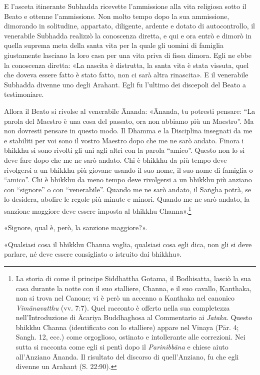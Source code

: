 E l’asceta itinerante Subhadda ricevette l’ammissione alla vita
religiosa sotto il Beato e ottenne l’ammissione. Non molto tempo dopo la
sua ammissione, dimorando in solitudine, appartato, diligente, ardente e
dotato di autocontrollo, il venerabile Subhadda realizzò la conoscenza
diretta, e qui e ora entrò e dimorò in quella suprema meta della santa
vita per la quale gli uomini di famiglia giustamente lasciano la loro
casa per una vita priva di fissa dimora.
Egli ne ebbe la conoscenza diretta: «La nascita è distrutta, la santa vita è stata vissuta, quel
che doveva essere fatto è stato fatto, non ci sarà altra rinascita». E
il venerabile Subhadda divenne uno degli Arahant. Egli fu l’ultimo dei
discepoli del Beato a testimoniare.


Allora il Beato si rivolse al venerabile Ānanda: «Ānanda, tu potresti
pensare: “La parola del Maestro è una cosa del passato, ora non abbiamo
più un Maestro”. Ma non dovresti pensare in questo modo. Il Dhamma e la
Disciplina insegnati da me e stabiliti per voi sono il vostro Maestro
dopo che me ne sarò andato. Finora i bhikkhu si sono rivolti gli uni
agli altri con la parola “amico”. Questo non lo si deve fare dopo che me
ne sarò andato. Chi è bhikkhu da più tempo deve rivolgersi a un bhikkhu
più giovane usando il suo nome, il suo nome di famiglia o “amico”. Chi è
bhikkhu da meno tempo deve rivolgersi a un bhikkhu più anziano con
“signore” o con “venerabile”. Quando me ne sarò andato, il Saṅgha potrà,
se lo desidera, abolire le regole più minute e minori. Quando me ne sarò
andato, la sanzione maggiore deve essere imposta al bhikkhu
Channa».\footnote{La storia di come il principe Siddhattha Gotama, il Bodhisatta, lasciò la sua casa durante la notte con il suo stalliere, Channa, e il suo cavallo, Kanthaka, non si trova nel Canone; vi è però un accenno a Kanthaka nel canonico \emph{Vimānavatthu} (vv. 7:7). Quel racconto è offerto nella sua completezza nell’Introduzione di Ācariya Buddhaghosa al Commentario ai \emph{Jataka}. Questo bhikkhu Channa (identificato con lo stalliere) appare nel Vinaya (Pār. 4; Sangh. 12, ecc.) come orgoglioso, ostinato e intollerante alle correzioni. Nei sutta si racconta come egli si pentì dopo il \emph{Parinibbāna} e chiese aiuto all’Anziano Ānanda. Il risultato del discorso di quell’Anziano, fu che egli divenne un Arahant (S. 22:90).}


«Signore, qual è, però, la sanzione maggiore?».


«Qualsiasi cosa il bhikkhu Channa voglia, qualsiasi cosa egli dica, non
gli si deve parlare, né deve essere consigliato o istruito dai bhikkhu».


